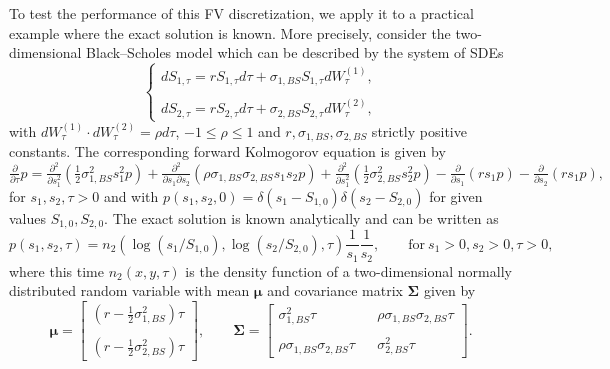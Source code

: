 \documentclass[10pt]{article}
\begin{document}
To test the performance of this FV discretization, we apply it to a practical example where the exact solution is known. More precisely, consider the two-dimensional Black--Scholes model which can be described by the system of SDEs
\begin{equation}
\left\{ \begin{array}{l}
dS_{1,\tau} = r S_{1,\tau} d\tau + \sigma_{1,BS} S_{1,\tau} dW^{(1)}_{\tau}, \\\\
dS_{2,\tau} = r S_{2,\tau} d\tau + \sigma_{2,BS} S_{2,\tau} dW^{(2)}_{\tau},
\end{array} \right.
\end{equation}
with $dW^{(1)}_{\tau} \cdot dW^{(2)}_{\tau} = \rho d\tau$, $-1 \le \rho \le 1$ and $r, \sigma_{1,BS},\sigma_{2,BS}$ strictly positive constants. The corresponding forward Kolmogorov equation is given by
\begin{equation}
\tfrac{\partial}{\partial \tau} p = \tfrac{\partial^{2}}{\partial s_{1}^{2}} \left( \tfrac{1}{2} \sigma_{1,BS}^{2}s_{1}^{2}p \right) + \tfrac{\partial^{2}}{\partial s_{1} \partial s_{2}} \left( \rho \sigma_{1,BS} \sigma_{2,BS} s_{1} s_{2} p \right) + \tfrac{\partial^{2}}{\partial s_{1}^{2}} \left( \tfrac{1}{2} \sigma_{2,BS}^{2} s_{2}^{2} p \right) - \tfrac{\partial}{\partial s_{1}} \left( r s_{1} p \right) - \tfrac{\partial}{\partial s_{2}} \left( r s_{1} p \right),
\end{equation}
for $s_{1}, s_{2}, \tau > 0$ and with $p(s_{1},s_{2},0)=\delta(s_{1}-S_{1,0})\delta(s_{2}-S_{2,0})$ for given values $S_{1,0}, S_{2,0}$.
The exact solution is known analytically and can be written as
\begin{equation}
p(s_{1},s_{2},\tau) = n_{2}(\log(s_{1}/S_{1,0}),\log(s_{2}/S_{2,0}),\tau)\frac{1}{s_{1}}\frac{1}{s_{2}}, \qquad \mathrm{for} \ s_{1}>0, s_{2}>0, \tau > 0,
\end{equation}
where this time $n_{2}(x,y,\tau)$ is the density function of a two-dimensional normally distributed random variable with mean $\boldsymbol{\mu}$ and covariance matrix $\boldsymbol{\Sigma}$ given by
$$ \boldsymbol{\mu} = \left[ \begin{array}{c}
(r - \tfrac{1}{2} \sigma^{2}_{1,BS})\tau \\\\ (r - \tfrac{1}{2} \sigma^{2}_{2,BS})\tau
\end{array} \right], \qquad
\boldsymbol{\Sigma} = \left[ \begin{array}{ccc}
\sigma^{2}_{1,BS}\tau && \rho \sigma_{1,BS}\sigma_{2,BS}\tau  \\\\
\rho \sigma_{1,BS}\sigma_{2,BS}\tau && \sigma^{2}_{2,BS}\tau
\end{array} \right]. $$
\end{document}
